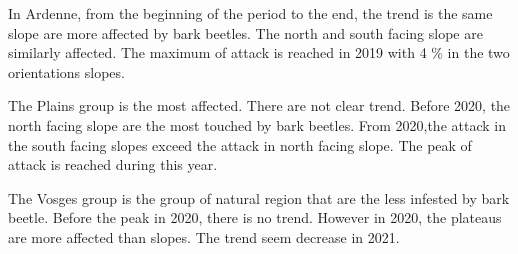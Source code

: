 \documentclass[3p,procedia]{elsarticle}
\begin{document}
In Ardenne, from the beginning of the period to the end, the trend is the same slope are more affected by bark beetles. 
The north and south facing slope are similarly affected. 
The maximum of attack is reached in 2019 with 4 \% in the two orientations slopes.

The Plains group is the most affected. 
There are not clear trend. Before 2020, the north facing slope are the most touched by bark beetles.
From 2020,the attack in the south facing slopes exceed the attack in north facing slope. 
The peak of attack is reached during this year.

The Vosges group is the group of natural region that are the less infested by bark beetle. 
Before the peak in 2020, there is no trend.
However in 2020, the plateaus are more affected than slopes.
The trend seem decrease in 2021.
  

 
 
\end{document}
